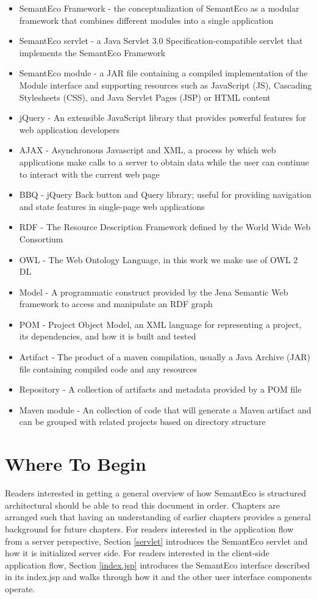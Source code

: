 \documentclass[letterpaper]{report}
\begin{document}
\begin{itemize}
\item SemantEco Framework - the conceptualization of SemantEco as a modular framework that combines different modules into a single application
\item SemantEco servlet - a Java Servlet 3.0 Specification-compatible servlet that implements the SemantEco Framework
\item SemantEco module - a JAR file containing a compiled implementation of the Module interface and supporting resources such as JavaScript (JS), Cascading Stylesheets (CSS), and Java Servlet Pages (JSP) or HTML content
\item jQuery - An extensible JavaScript library that provides powerful features for web application developers
\item AJAX - Asynchronous Javascript and XML, a process by which web applications make calls to a server to obtain data while the user can continue to interact with the current web page
\item BBQ - jQuery Back button and Query library; useful for providing navigation and state features in single-page web applications
\item RDF - The Resource Description Framework defined by the World Wide Web Consortium
\item OWL - The Web Ontology Language, in this work we make use of OWL 2 DL
\item Model - A programmatic construct provided by the Jena Semantic Web framework to access and manipulate an RDF graph
\item POM - Project Object Model, an XML language for representing a project, its dependencies, and how it is built and tested
\item Artifact - The product of a maven compilation, usually a Java Archive (JAR) file containing compiled code and any resources
\item Repository - A collection of artifacts and metadata provided by a POM file
\item Maven module - An collection of code that will generate a Maven artifact and can be grouped with related projects based on directory structure
\end{itemize}

\section{Where To Begin}
Readers interested in getting a general overview of how SemantEco is structured architectural should be able to read this document in order. Chapters are arranged such that having an understanding of earlier chapters provides a general background for future chapters. For readers interested in the application flow from a server perspective, Section \ref{servlet} introduces the SemantEco servlet and how it is initialized server side. For readers interested in the client-side application flow, Section \ref{index.jsp} introduces the SemantEco interface described in its index.jsp and walks through how it and the other user interface components operate.
\end{document}

